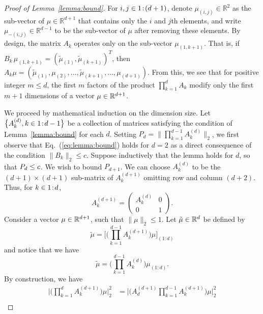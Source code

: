 \begin{proof}[Proof of Lemma~\ref{lemma:bound}]
  For $i, j \in {1}\!:\!{(d+1)}$, denote $\mu_{(i, j)} \in \mathbb{R}^2$ as the sub-vector of $\mu \in \mathbb{R}^{d+1}$ that contains only the $i$ and $j$th elements, and write $\mu_{-(i, j)} \in \mathbb{R}^{d-1}$ to be the sub-vector of $\mu$ after removing these elements.
  By design, the matrix $A_k$ operates only on the sub-vector $\mu_{(1, k+1)}$.
That is, if $B_k \, \mu_{(1, k+1)} = (\tilde{\mu}_{(1)}, \tilde{\mu}_{(k+1)})^T$, then $A_k\mu = (\tilde{\mu}_{(1)}, \mu_{(2)}, \ldots, \tilde{\mu}_{(k + 1)}, \ldots, \mu_{(d+1)})$.
  From this, we see that for positive integer $m \leq d$,
  the first $m$ factors of the product $\prod_{k = 1}^d A_k$ modify only the first $m + 1$ dimensions of a vector $\mu \in \mathbb{R}^{d+1}$.
  
We proceed by mathematical induction on the dimension size.
Let $\big\{A^{(d)}_k, k\in {1}\!:\!{d-1}\big\}$ be a collection of matrices satisfying the condition of Lemma~\ref{lemma:bound} for each $d$.
Setting $P_d=\big\|\prod_{k = 1}^{d-1} A^{(d)}_k \big\|_2$, we first observe that Eq.~(\ref{eq:lemma:bound}) holds for $d=2$ as a direct consequence of the condition $\|B_k\|_2 \leq c$.
Suppose inductively that the lemma holds for $d$, so that $P_d\leq c$.
We wish to bound $P_{d+1}$.
We can choose $A^{(d)}_k$ to be the $(d+1)\times (d+1)$ sub-matrix of $A^{(d+1)}_k$ omitting row and column $(d+2)$.
Thus, for $k\in{1}\!:\!{d}$,
\begin{equation*}
A^{(d+1)}_k =
  \begin{pmatrix}
    A^{(d)}_k & 0 \\
    0 & 1
  \end{pmatrix}.
\end{equation*}
Consider a vector $\mu \in \mathbb{R}^{d+1}$, such that $\|\mu\|_2 \leq 1$.
Let $\tilde{\mu} \in \mathbb{R}^{d}$ be defined by 
\begin{equation}
\tilde{\mu} = \bigg[\bigg(\prod_{k = 1}^{d-1} A^{(d+1)}_k\bigg)\mu\bigg]_{(1:d)}
\end{equation}
and notice that we have
\begin{equation}\label{eq:lemma:d}
\tilde{\mu} = \bigg(\prod_{k = 1}^{d-1} A^{(d)}_k\bigg)\mu_{(1:d)}.
\end{equation}
By construction, we have 
\begin{align*}
    \bigg|\Big(\prod_{k = 1}^d A^{(d+1)}_k\Big)\mu \bigg|^2_2 &= \bigg|\Big(A^{(d+1)}_d\prod_{k = 1}^{d-1} A^{(d+1)}_k\Big)\mu \bigg|^2_2\\

\end{align*}
\end{proof}
